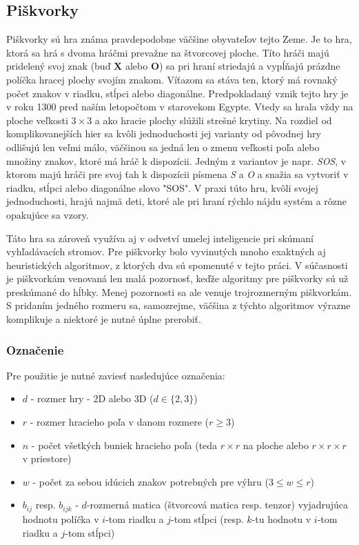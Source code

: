 \subsection{Piškvorky}\label{subsec:tic-tac-toe}

Piškvorky sú hra známa pravdepodobne väčšine obyvateľov tejto Zeme.
Je to hra, ktorá sa hrá s dvoma hráčmi prevažne na štvorcovej ploche.
Títo hráči majú pridelený svoj znak (buď \textbf{X} alebo \textbf{O}) sa pri hraní striedajú a vypĺňajú prázdne políčka
hracej plochy svojím znakom.
Víťazom sa stáva ten, ktorý má rovnaký počet znakov v riadku, stĺpci alebo diagonálne.
Predpokladaný vznik tejto hry je v roku 1300 pred naším letopočtom v starovekom
Egypte.\cite{tic_tac_toe_first_appearance}
Vtedy sa hrala vždy na ploche veľkosti $3 \times 3$ a ako hracie plochy slúžili strešné krytiny.
Na rozdiel od komplikovanejších hier sa kvôli jednoduchosti jej varianty od pôvodnej hry odlišujú len veľmi
málo,\cite{tic_tac_toe_variants} väčšinou sa jedná len o zmenu veľkosti poľa alebo množiny znakov, ktoré má hráč k
dispozícii.
Jedným z variantov je napr. \emph{SOS}, v ktorom majú hráči pre svoj ťah k dispozícii písmena \emph{S} a \emph{O} a
snažia sa vytvoriť v riadku, stĺpci alebo diagonálne slovo "SOS".\cite{tic_tac_toe_sos}
V praxi túto hru, kvôli svojej jednoduchosti, hrajú najmä deti, ktoré ale pri hraní rýchlo nájdu systém a rôzne
opakujúce sa vzory.

Táto hra sa zároveň využíva aj v odvetví umelej inteligencie pri skúmaní vyhľadávacích stromov.
Pre piškvorky bolo vyvinutých mnoho exaktných aj heuristických algoritmov, z ktorých dva sú spomenuté v tejto práci.
V súčasnosti je piškvorkám venovaná len malá pozornosť, keďže algoritmy pre piškvorky sú už preskúmané do hĺbky.
Menej pozornosti sa ale venuje trojrozmerným piškvorkám.
S pridaním jedného rozmeru sa, samozrejme, väčšina z týchto algoritmov výrazne komplikuje a niektoré je nutné úplne
prerobiť.

\subsubsection{Označenie}

Pre použitie je nutné zaviesť nasledujúce označenia:
\begin{itemize}
    \item $d$ - rozmer hry - 2D alebo 3D ($d \in \{2,3\}$)
    \item $r$ - rozmer hracieho poľa v danom rozmere ($r \geq 3$)
    \item $n$ - počet všetkých buniek hracieho poľa (teda $r \times r$ na ploche alebo $r \times r \times r$ v
    priestore)
    \item $w$ - počet za sebou idúcich znakov potrebných pre výhru ($3 \leq w \leq r$)
    \item $b_{ij}$ resp. $b_{ijk}$ - $d$-rozmerná matica (štvorcová matica resp. tenzor) vyjadrujúca hodnotu políčka v
    $i$-tom riadku a $j$-tom stĺpci (resp. $k$-tu hodnotu v $i$-tom riadku a $j$-tom stĺpci)
\end{itemize}


